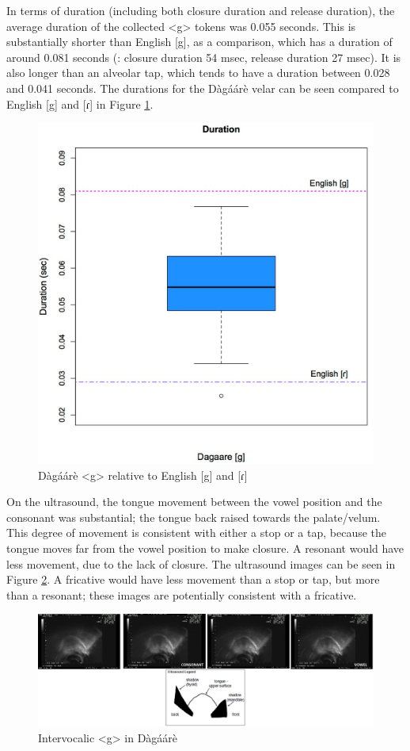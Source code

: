 \documentclass[output=paper, modfonts]{langscibook}
\begin{document}
In terms of duration (including both closure duration and release duration), the average duration of the collected <g> tokens was 0.055 seconds. This is substantially shorter than English [g], as a comparison, which has a duration of around 0.081 seconds (\citealt{byrd199354}: closure duration 54 msec, release duration 27 msec). It is also longer than an alveolar tap, which tends to have a duration between 0.028 and 0.041 seconds. The durations for the D\`ag\'a\'ar\`e velar can be seen compared to English [g] and [ɾ] in Figure \ref{tab:2:duration}. 

\begin{figure}[h]
\includegraphics[width=0.7\linewidth]{g_duration.jpg}
\caption{Dàgáárè <g> relative to English [g] and [ɾ]}
\label{tab:2:duration}
\end{figure}


On the ultrasound, the tongue movement between the vowel position and the consonant was substantial; the tongue back raised towards the palate/velum. This degree of movement is consistent with either a stop or a tap, because the tongue moves far from the vowel position to make closure. A resonant would have less movement, due to the lack of closure. The ultrasound images can be seen in Figure \ref{tab:3:ultrasound}. A fricative would have less movement than a stop or tap, but more than a resonant; these images are  potentially consistent with a fricative. 

\begin{figure}
\includegraphics[width=1\linewidth]{ultrasound.jpg}
\caption{Intervocalic <g> in Dàgáárè}
\label{tab:3:ultrasound}
\end{figure}
\end{document}
